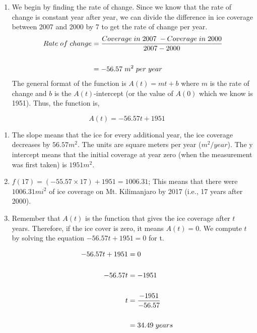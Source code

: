 \documentclass[
  letterpaper,
  DIV=11,
  numbers=noendperiod]{scrreprt}
\providecommand{\tightlist}{%
  \setlength{\itemsep}{0pt}\setlength{\parskip}{0pt}}\usepackage{longtable,booktabs,array}
\begin{document}
\begin{enumerate}
\def\labelenumi{\alph{enumi})}
\tightlist
\item
  We begin by finding the rate of change. Since we know that the rate of
  change is constant year after year, we can divide the difference in
  ice coverage between 2007 and 2000 by 7 to get the rate of change per
  year. \begin{align}
  Rate\hspace{.04in} of\hspace{.04in} change &=  \frac{Coverage \hspace{.04in} in \hspace{.04in} 2007 \hspace{.04in}- Coverage \hspace{.04in} in \hspace{.04in} 2000}{2007-2000}\\\\
  &= - 56.57\hspace{.04in} m^2\hspace{.04in} per \hspace{.04in} year
  \end{align} The general format of the function is \(A(t)=mt+b\) where
  \(m\) is the rate of change and \(b\) is the \(A(t)\)-intercept (or
  the value of \(A(0)\) which we know is 1951). Thus, the function is,
\end{enumerate}

\[A(t)=-56.57t + 1951\]

\begin{enumerate}
\def\labelenumi{\alph{enumi})}
\setcounter{enumi}{1}
\item
  The slope means that the ice for every additional year, the ice
  coverage decreases by \(56.57 m^2\). The units are square meters per
  year (\(m^2/year\)). The y intercept means that the initial coverage
  at year zero (when the measurement was first taken) is \(1951 m^2\).
\item
  \(f(17)=(-55.57\times17)+1951=1006.31\); This means that there were
  \(1006.31 mi^2\) of ice coverage on Mt. Kilimanjaro by 2017 (i.e., 17
  years after 2000).
\item
  Remember that \(A(t)\) is the function that gives the ice coverage
  after \(t\) years. Therefore, if the ice cover is zero, it means
  \(A(t)=0\). We compute \(t\) by solving the equation
  \(-56.57t + 1951=0\) for t.
\end{enumerate}

\[
\begin{aligned}
  -56.57t + 1951&=0\\\\
  -56.57t&=-1951\\\\
  t&=\frac{-1951}{-56.57}\\\\
  &=34.49 \hspace{0.04in} years
  \end{aligned}
\]
\end{document}
